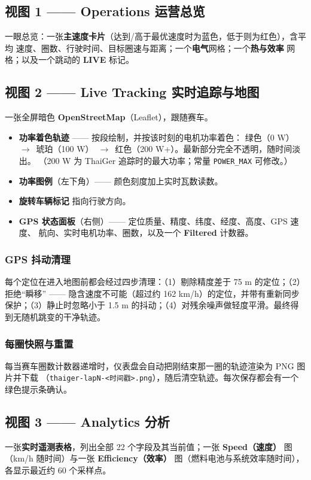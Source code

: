 \documentclass[11pt,a4paper,oneside]{report}
\newcommand{\arrow}{\,$\rightarrow$\,}
\newcommand{\code}[1]{\texttt{#1}}
\begin{document}
\subsection{视图 1 —— Operations 运营总览}
一眼总览：一张\textbf{主速度卡片}（达到/高于最优速度时为蓝色，低于则为红色），含平均
速度、圈数、行驶时间、目标圈速与距离；一个\textbf{电气}网格；一个\textbf{热与效率}
网格；以及一个跳动的 \textbf{LIVE} 标记。

\subsection{视图 2 —— Live Tracking 实时追踪与地图}
一张全屏暗色 \textbf{OpenStreetMap}（Leaflet），跟随赛车。
\begin{itemize}
  \item \textbf{功率着色轨迹} —— 按段绘制，并按该时刻的电机功率着色：
    \textcolor{tgreen}{绿色（0 W）} \arrow{} \textcolor{tamber}{琥珀（100 W）}
    \arrow{} \textcolor{tred}{红色（200 W+）}。最新部分完全不透明，随时间淡出。
    （200 W 为 ThaiGer 追踪时的最大功率；常量 \code{POWER\_MAX} 可修改。）
  \item \textbf{功率图例}（左下角）—— 颜色刻度加上实时瓦数读数。
  \item \textbf{旋转车辆标记} 指向行驶方向。
  \item \textbf{GPS 状态面板}（右侧）—— 定位质量、精度、纬度、经度、高度、GPS 速度、
    航向、实时电机功率、圈数，以及一个 \textbf{Filtered} 计数器。
\end{itemize}

\subsubsection{GPS 抖动清理}
每个定位在进入地图前都会经过四步清理：（1）剔除精度差于 75 m 的定位；（2）拒绝“瞬移”
—— 隐含速度不可能（超过约 162 km/h）的定位，并带有重新同步保护；（3）静止时忽略小于
1.5 m 的抖动；（4）对残余噪声做轻度平滑。最终得到无随机跳变的干净轨迹。

\subsubsection{每圈快照与重置}
每当赛车圈数计数器递增时，仪表盘会自动把刚结束那一圈的轨迹渲染为 PNG 图片并下载
（\code{thaiger-lapN-<时间戳>.png}），随后清空轨迹。每次保存都会有一个绿色提示条确认。

\subsection{视图 3 —— Analytics 分析}
一张\textbf{实时遥测表格}，列出全部 22 个字段及其当前值；一张 \textbf{Speed（速度）}
图（km/h 随时间）与一张 \textbf{Efficiency（效率）} 图（燃料电池与系统效率随时间），
各显示最近约 60 个采样点。
\end{document}
